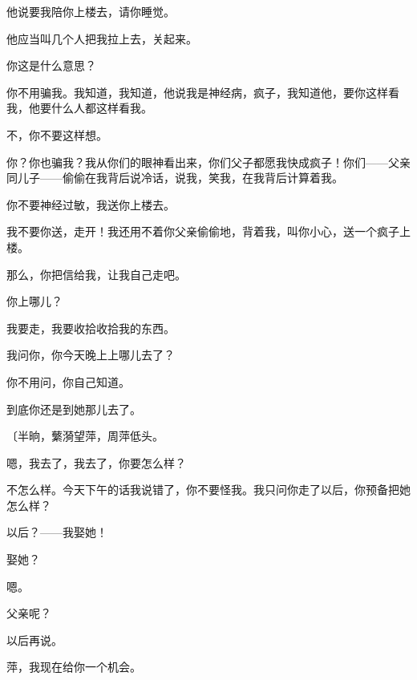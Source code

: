 他说要我陪你上楼去，请你睡觉。

他应当叫几个人把我拉上去，关起来。

你这是什么意思？

你不用骗我。我知道，我知道，他说我是神经病，疯子，我知道他，要你这样看我，他要什么人都这样看我。

不，你不要这样想。

你？你也骗我？我从你们的眼神看出来，你们父子都愿我快成疯子！你们——父亲同儿子——偷偷在我背后说冷话，说我，笑我，在我背后计算着我。

你不要神经过敏，我送你上楼去。

我不要你送，走开！我还用不着你父亲偷偷地，背着我，叫你小心，送一个疯子上楼。

那么，你把信给我，让我自己走吧。

你上哪儿？

我要走，我要收拾收拾我的东西。

我问你，你今天晚上上哪儿去了？

你不用问，你自己知道。

到底你还是到她那儿去了。

{\fangsong〔半晌，蘩漪望萍，周萍低头。}

嗯，我去了，我去了，你要怎么样？

不怎么样。今天下午的话我说错了，你不要怪我。我只问你走了以后，你预备把她怎么样？

以后？——我娶她！

娶她？

嗯。

父亲呢？

以后再说。

萍，我现在给你一个机会。

